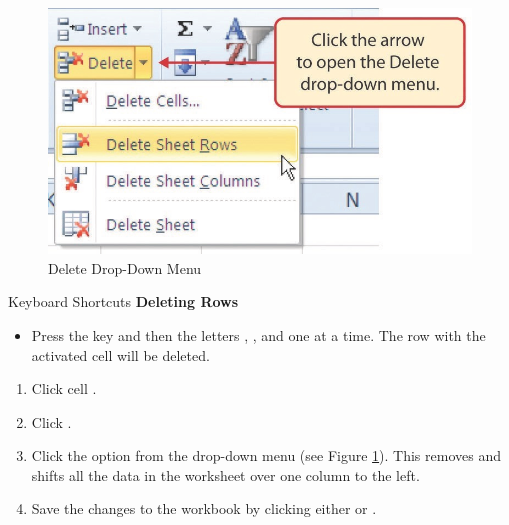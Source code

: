 \begin{figure}[H]
	\centering
	\includegraphics[width=\maxwidth{.95\linewidth}]{gfx/ch01_fig31}
	\caption{Delete Drop-Down Menu}
	\label{01:fig31}
\end{figure}

\begin{center}
	\begin{shtcutbox}{Keyboard Shortcuts}
		\textbf{Deleting Rows}
		\\
		\begin{itemize}
			\setlength{\itemsep}{0pt}
			\setlength{\parskip}{0pt}
			\setlength{\parsep}{0pt}
			
			\item Press the  key and then the letters , , and  one at a time. The row with the activated cell will be deleted.
			
		\end{itemize}
	\end{shtcutbox}
\end{center}

\begin{enumerate}[resume]
	\item Click cell .
	\item Click .
	\item Click the  option from the drop-down menu (see Figure \ref{01:fig31}). This removes  and shifts all the data in the worksheet over one column to the left.
	\item Save the changes to the workbook by clicking either  or .
\end{enumerate}


